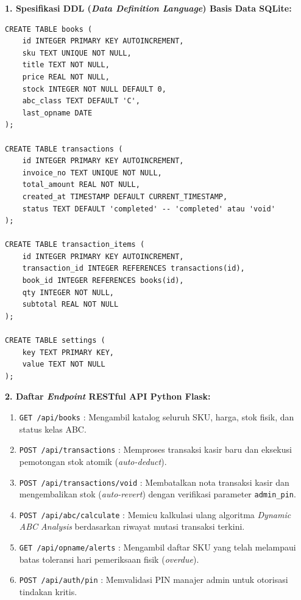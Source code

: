 \documentclass[11pt, a4paper]{article}
\begin{document}
\noindent
\textbf{1. Spesifikasi DDL (\textit{Data Definition Language}) Basis Data SQLite:}
\begin{singlespace}
\begin{verbatim}
CREATE TABLE books (
    id INTEGER PRIMARY KEY AUTOINCREMENT,
    sku TEXT UNIQUE NOT NULL,
    title TEXT NOT NULL,
    price REAL NOT NULL,
    stock INTEGER NOT NULL DEFAULT 0,
    abc_class TEXT DEFAULT 'C',
    last_opname DATE
);

CREATE TABLE transactions (
    id INTEGER PRIMARY KEY AUTOINCREMENT,
    invoice_no TEXT UNIQUE NOT NULL,
    total_amount REAL NOT NULL,
    created_at TIMESTAMP DEFAULT CURRENT_TIMESTAMP,
    status TEXT DEFAULT 'completed' -- 'completed' atau 'void'
);

CREATE TABLE transaction_items (
    id INTEGER PRIMARY KEY AUTOINCREMENT,
    transaction_id INTEGER REFERENCES transactions(id),
    book_id INTEGER REFERENCES books(id),
    qty INTEGER NOT NULL,
    subtotal REAL NOT NULL
);

CREATE TABLE settings (
    key TEXT PRIMARY KEY,
    value TEXT NOT NULL
);
\end{verbatim}
\end{singlespace}

\vspace{0.4cm}
\noindent
\textbf{2. Daftar \textit{Endpoint} RESTful API Python Flask:}
\begin{enumerate}[label=\alph*.]
    \item \texttt{GET /api/books} : Mengambil katalog seluruh SKU, harga, stok fisik, dan status kelas ABC.
    \item \texttt{POST /api/transactions} : Memproses transaksi kasir baru dan eksekusi pemotongan stok atomik (\textit{auto-deduct}).
    \item \texttt{POST /api/transactions/void} : Membatalkan nota transaksi kasir dan mengembalikan stok (\textit{auto-revert}) dengan verifikasi parameter \texttt{admin\_pin}.
    \item \texttt{POST /api/abc/calculate} : Memicu kalkulasi ulang algoritma \textit{Dynamic ABC Analysis} berdasarkan riwayat mutasi transaksi terkini.
    \item \texttt{GET /api/opname/alerts} : Mengambil daftar SKU yang telah melampaui batas toleransi hari pemeriksaan fisik (\textit{overdue}).
    \item \texttt{POST /api/auth/pin} : Memvalidasi PIN manajer admin untuk otorisasi tindakan kritis.
\end{enumerate}
\end{document}
